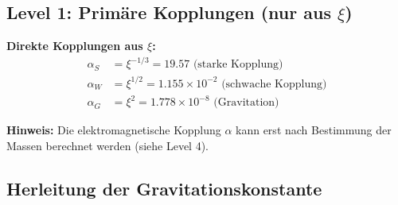 \documentclass[12pt,a4paper]{article}
\newcommand{\xipar}{\xi}
\newcommand{\alphas}{\alpha_S}
\newcommand{\alphaw}{\alpha_W}
\newcommand{\alphag}{\alpha_G}
\begin{document}
	\subsection{Level 1: Primäre Kopplungen (nur aus $\xi$)}
	
	\begin{primary}
		\textbf{Direkte Kopplungen aus $\xi$:}
		\begin{align}
			\alphas &= \xipar^{-1/3} = 19.57 \text{ (starke Kopplung)} \\
			\alphaw &= \xipar^{1/2} = 1.155 \times 10^{-2} \text{ (schwache Kopplung)} \\
			\alphag &= \xipar^{2} = 1.778 \times 10^{-8} \text{ (Gravitation)}
		\end{align}
		
		\textbf{Hinweis:} Die elektromagnetische Kopplung $\alpha$ kann erst nach Bestimmung der Massen berechnet werden (siehe Level 4).
	\end{primary}
	
	\subsection{Herleitung der Gravitationskonstante}
	
\end{document}
